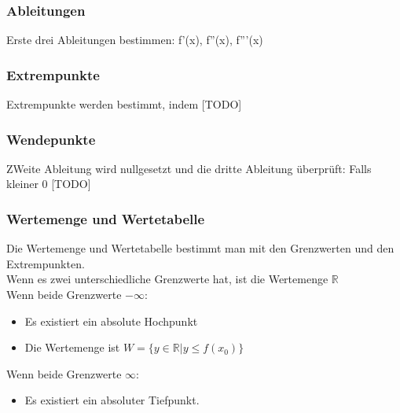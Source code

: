 \documentclass{article}
\newcommand{\R}{\mathbb{R}}
\begin{document}
	\subsubsection{Ableitungen}
	Erste drei Ableitungen bestimmen: f'(x), f''(x), f'''(x)
	\subsubsection{Extrempunkte}
	Extrempunkte werden bestimmt, indem [TODO]
	\subsubsection{Wendepunkte}
	ZWeite Ableitung wird nullgesetzt und die dritte Ableitung überprüft: Falls kleiner 0 [TODO]
	\subsubsection{Wertemenge und Wertetabelle}
	Die Wertemenge und Wertetabelle bestimmt man mit den Grenzwerten und den Extrempunkten. \\
	Wenn es zwei unterschiedliche Grenzwerte hat, ist die Wertemenge $\R$ \\
	Wenn beide Grenzwerte $-\infty$:
	\begin{itemize}
		\item{Es existiert ein absolute Hochpunkt}
		\item{Die Wertemenge ist $W=\{y\in \R| y\leq f(x_0)\}$}
	\end{itemize}
	Wenn beide Grenzwerte $\infty$:
	\begin{itemize}
		\item{Es existiert ein absoluter Tiefpunkt.}
	\end{itemize}
\end{document}

